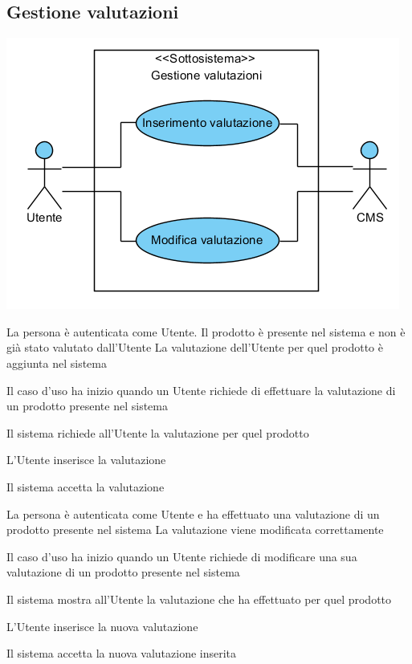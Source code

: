 \subsection{Gestione valutazioni}
\begin{center}
   \includegraphics[width=\textwidth]{assets/visualParadigm/GestioneValutazioni}
\end{center}
{}
{La persona è autenticata come Utente. Il prodotto è presente nel sistema e non è già stato valutato dall'Utente}
{La valutazione dell'Utente per quel prodotto è aggiunta nel sistema}
{\begin{enumCU}
	\item Il caso d'uso ha inizio quando un Utente richiede di effettuare la valutazione di un prodotto presente nel sistema
	\item Il sistema richiede all'Utente la valutazione per quel prodotto
	\item L'Utente inserisce la valutazione
	\item Il sistema accetta la valutazione
\end{enumCU}}

\tabcuvspace

{}
{La persona è autenticata come Utente e ha effettuato una valutazione di un prodotto presente nel sistema}
{La valutazione viene modificata correttamente}
{\begin{enumCU}
	\item Il caso d'uso ha inizio quando un Utente richiede di modificare una sua valutazione di un prodotto presente nel sistema
	\item Il sistema mostra all'Utente la valutazione che ha effettuato per quel prodotto
	\item L'Utente inserisce la nuova valutazione
	\item Il sistema accetta la nuova valutazione inserita
\end{enumCU}}

